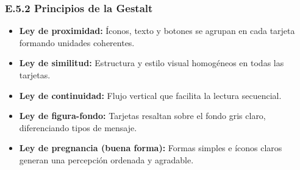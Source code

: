 \documentclass[12pt,a4paper,oneside]{article}
\begin{document}
\subsubsection*{E.5.2 Principios de la Gestalt}
\begin{itemize}
    \item \textbf{Ley de proximidad:}  
    Íconos, texto y botones se agrupan en cada tarjeta formando unidades coherentes.

    \item \textbf{Ley de similitud:}  
    Estructura y estilo visual homogéneos en todas las tarjetas.

    \item \textbf{Ley de continuidad:}  
    Flujo vertical que facilita la lectura secuencial.

    \item \textbf{Ley de figura-fondo:}  
    Tarjetas resaltan sobre el fondo gris claro, diferenciando tipos de mensaje.

    \item \textbf{Ley de pregnancia (buena forma):}  
    Formas simples e íconos claros generan una percepción ordenada y agradable.
\end{itemize}
\end{document}
